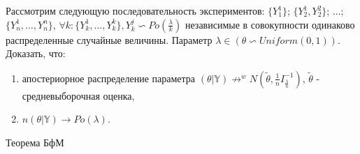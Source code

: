 \begin{problem}
Рассмотрим следующую последовательность экспериментов:
$\{Y_1^1\}$; $\{Y_2^1, Y_2^2\}$; ...;$\{Y_n^1,..., Y_n^n\}$, $\forall k: \{Y_k^1,...,Y_k^k\}, Y_k^j \backsim Po(\frac{\lambda}{k})$ независимые в совокупности одинаково распределенные случайные величины. Параметр $\lambda \in (\theta \backsim Uniform(0, 1))$. Доказать, что:
\begin{enumerate}
\item апостериорное распределение параметра $(\theta|\mathbb{Y}) \not\rightarrow^{w} N(\tilde{\theta},\frac{1}{n}I_{\frac{\lambda}{n}}^{-1} )$, $\tilde{\theta}$ - средневыборочная оценка,
\item $n(\theta|\mathbb{Y}) \rightarrow Po(\lambda)$.
\end{enumerate}
\end{problem}
\begin{remark} Теорема БфМ 
\end{remark}
